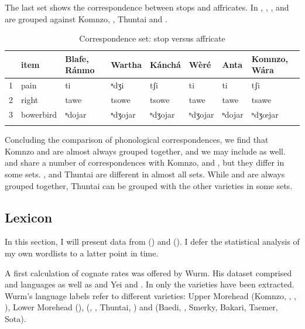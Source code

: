 The last set shows the correspondence between stops and affricates. In , , ,  and  are grouped against Komnzo, ,  Thuntai and .

\begin{table}
\caption{Correspondence set: stop versus affricate}
\label{affrstop}
	\begin{tabularx}{\textwidth}{llXXXXXX}
		\lsptoprule
			&{item} &Blafe, Ránmo &Wartha &Kánchá &Wèré &Anta &Komnzo, Wára\\\midrule
			1 &{pain} &ti &ⁿdʒi &tʃi &ti &ti &tʃi\\
			2 &{right} &tawe &tsowe &tsowe &tawe &tawe &tsawe\\
			3 &{bowerbird} &ⁿdojar &ⁿdʒojar &ⁿdʒojar &ⁿdʒojar &ⁿdojar &ⁿdʒœjar\\
		\lspbottomrule
	\end{tabularx}
\end{table}%

Concluding the comparison of phonological correspondences, we find that Komnzo and  are almost always grouped together, and we may include  as well.  and  share a number of correspondences with Komnzo,  and , but they differ in some sets. ,  and  Thuntai are different in almost all sets. While  and  are always grouped together,  Thuntai can be grouped with the other varieties in some sets.

\subsection{Lexicon}\label{comp-lex}

In this section, I will present data from (\citealt{Wurm:1971uw}) and (\citealt{Clifton:1991fly}). I defer the statistical analysis of my own wordlists to a latter point in time.

A first calculation of cognate rates was offered by Wurm. His dataset comprised  and  languages as well as and Yei and . In  only the  varieties have been extracted. Wurm's language labels refer to different  varieties: Upper Morehead (Komnzo, , , ), Lower Morehead (),  (, ,  Thuntai, ) and  (Baedi, , Smerky, Bakari, Taemer, Sota).

